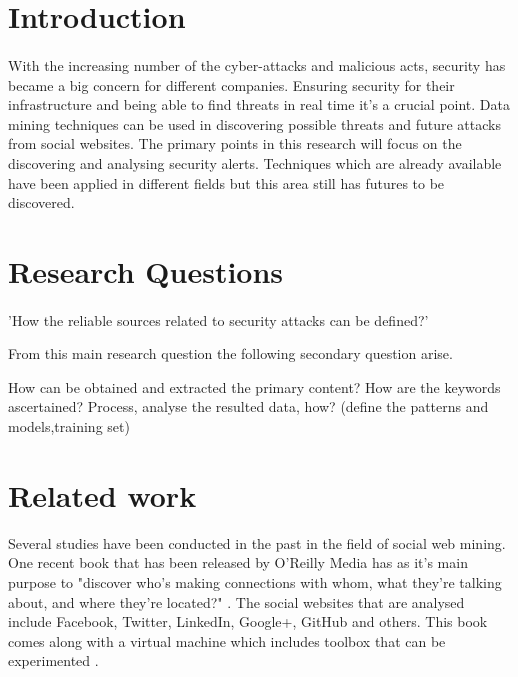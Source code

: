\documentclass[12pt]{article}
\begin{document}
\tableofcontents

\newpage

\section*{Introduction}
\paragraph{}
With the increasing number of the cyber-attacks and malicious acts, security has became a big concern for different companies. Ensuring security for their infrastructure and being able to find threats in real time it's a crucial point. Data mining techniques can be used in discovering possible threats and future attacks from social websites. The primary points in this research will focus on the discovering and analysing security alerts. Techniques which are already available have been applied in different fields but this area still has futures to be discovered.

\section{Research Questions}
\paragraph{}

'How the reliable sources related to security attacks can be defined?'

From this main research question the following secondary question arise. 

How can be obtained and extracted the primary content?
How are the keywords ascertained?
Process, analyse the resulted data, how? (define the patterns and models,training set)


\section{Related work}

Several studies have been conducted in the past in the field of social web mining. One recent book that has been released by  O'Reilly Media has as it's main purpose to  "discover who’s making connections with whom, what they’re talking about, and where they’re located?" \cite{first}. The social websites that are analysed include Facebook, Twitter, LinkedIn, Google+, GitHub and others. This book comes along with a virtual machine which includes toolbox that can be experimented \cite{second}.
\end{document}

